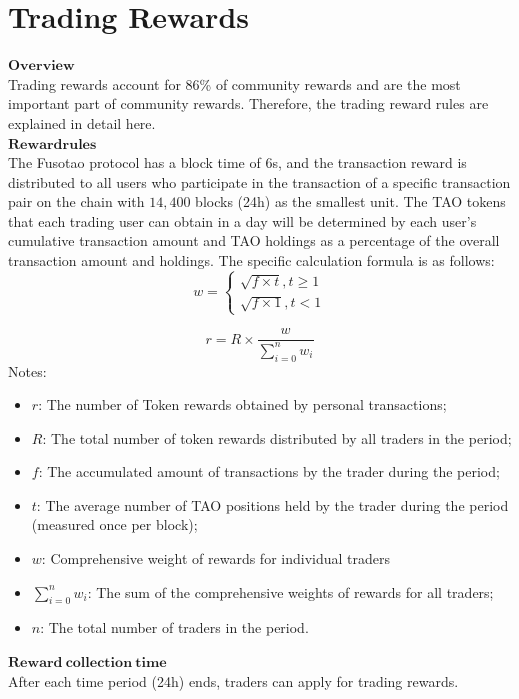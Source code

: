 \documentclass[a4paper,12pt]{article}
\begin{document}
\section{Trading Rewards}
\label{sec:5}
$\mathbf{Overview}$\\
Trading rewards account for 86\% of community rewards and are the most important part of community rewards. Therefore, the trading reward rules are explained in detail here.\\
$\mathbf{Reward rules}$\\
The Fusotao protocol has a block time of 6s, and the transaction reward is distributed to all users who participate in the transaction of a specific transaction pair on the chain with $14,400$ blocks (24h) as the smallest unit. The TAO tokens that each trading user can obtain in a day will be determined by each user's cumulative transaction amount and TAO holdings as a percentage of the overall transaction amount and holdings. The specific calculation formula is as follows:\\
\begin{equation*}
    w=\left\{\begin{matrix} \sqrt{f \times t},t \ge 1 
        \\ \sqrt{f \times 1}, t < 1
\end{matrix}\right.
\end{equation*}

\begin{equation*}
    r=R \times \frac{w}{\sum_{i=0}^{n}w_{i}}
\end{equation*}
Notes:\\
\begin{itemize}
    \item $r$: The number of Token rewards obtained by personal transactions;
    \item $R$: The total number of token rewards distributed by all traders in the period;
    \item $f$: The accumulated amount of transactions by the trader during the period;
    \item $t$: The average number of TAO positions held by the trader during the period (measured once per block);
    \item $w$: Comprehensive weight of rewards for individual traders
    \item $\sum_{i=0}^{n}w_{i}$: The sum of the comprehensive weights of rewards for all traders;
    \item $n$: The total number of traders in the period.
\end{itemize}
$\mathbf{Reward \ collection \ time}$\\
After each time period (24h) ends, traders can apply for trading rewards.\\
\end{document}
